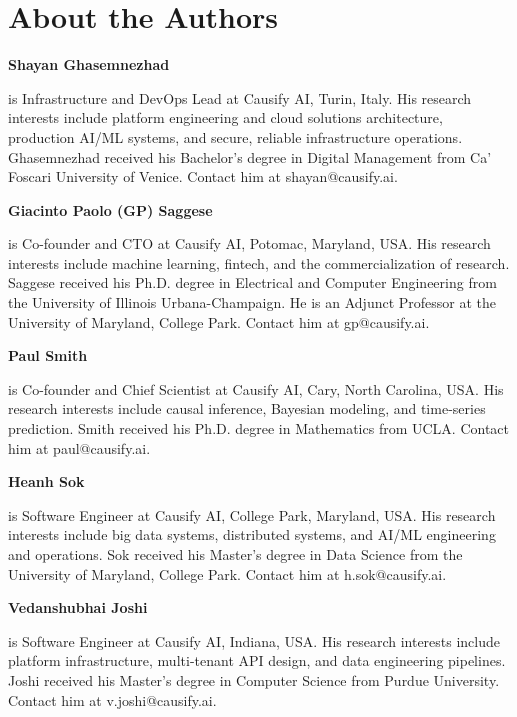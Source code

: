 \documentclass[11pt, reqno]{amsart}
\newenvironment{authorbio}[1]{%
  \par\noindent\textbf{#1}\nobreakspace\ignorespaces
}{\par\vspace{0.4em}}
\begin{document}















\section*{About the Authors}

\begin{authorbio}{Shayan Ghasemnezhad}
is Infrastructure and DevOps Lead at Causify AI, Turin, Italy. His research interests include platform engineering and cloud solutions architecture, production AI/ML systems, and secure, reliable infrastructure operations. Ghasemnezhad received his Bachelor's degree in Digital Management from Ca' Foscari University of Venice. Contact him at shayan@causify.ai.
\end{authorbio}

\begin{authorbio}{Giacinto Paolo (GP) Saggese}
is Co-founder and CTO at Causify AI, Potomac, Maryland, USA. His research interests include machine learning, fintech, and the commercialization of research. Saggese received his Ph.D. degree in Electrical and Computer Engineering from the University of Illinois Urbana-Champaign. He is an Adjunct Professor at the University of Maryland, College Park. Contact him at gp@causify.ai.
\end{authorbio}

\begin{authorbio}{Paul Smith}
is Co-founder and Chief Scientist at Causify AI, Cary, North Carolina, USA. His research interests include causal inference, Bayesian modeling, and time-series prediction. Smith received his Ph.D. degree in Mathematics from UCLA. Contact him at paul@causify.ai.
\end{authorbio}

\begin{authorbio}{Heanh Sok}
is Software Engineer at Causify AI, College Park, Maryland, USA. His research interests include big data systems, distributed systems, and AI/ML engineering and operations. Sok received his Master's degree in Data Science from the University of Maryland, College Park. Contact him at h.sok@causify.ai.
\end{authorbio}

\begin{authorbio}{Vedanshubhai Joshi}
is Software Engineer at Causify AI, Indiana, USA. His research interests include platform infrastructure, multi-tenant API design, and data engineering pipelines. Joshi received his Master's degree in Computer Science from Purdue University. Contact him at v.joshi@causify.ai.
\end{authorbio}
\end{document}

